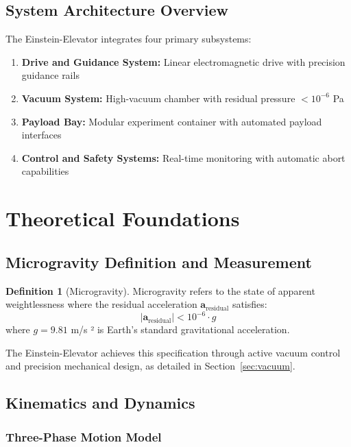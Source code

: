 ﻿\documentclass[a4paper,12pt]{article}
\theoremstyle{definition}
\newtheorem{definition}{Definition}
\begin{document}
\subsection{System Architecture Overview}

The Einstein-Elevator integrates four primary subsystems:

\begin{enumerate}
	\item \textbf{Drive and Guidance System:} Linear electromagnetic drive with precision guidance rails
	\item \textbf{Vacuum System:} High-vacuum chamber with residual pressure $< 10^{-6}$ Pa
	\item \textbf{Payload Bay:} Modular experiment container with automated payload interfaces
	\item \textbf{Control and Safety Systems:} Real-time monitoring with automatic abort capabilities
\end{enumerate}

\section{Theoretical Foundations}

\subsection{Microgravity Definition and Measurement}

\begin{definition}[Microgravity]
Microgravity refers to the state of apparent weightlessness where the residual acceleration $\mathbf{a}_{\text{residual}}$ satisfies:
\[
|\mathbf{a}_{\text{residual}}| < 10^{-6} \cdot g
\]
where $g = 9.81$ m/s ² is Earth's standard gravitational acceleration.
\end{definition}

The Einstein-Elevator achieves this specification through active vacuum control and precision mechanical design, as detailed in Section~\ref{sec:vacuum}.

\subsection{Kinematics and Dynamics}

\subsubsection{Three-Phase Motion Model}
\end{document}
